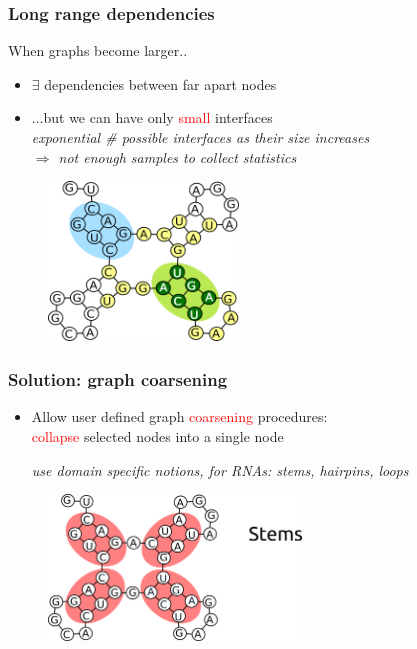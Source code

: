 \documentclass{beamer}
\newcommand{\red}[1]{\textcolor{red}{#1}}
\begin{document}
\begin{frame}
    \frametitle{Long range dependencies}
    When graphs become larger..
    \begin{itemize}
        \item $\exists$ dependencies between far apart nodes 
        \item ...but we can have only \red{small} interfaces  \\
        {\em exponential \# possible interfaces as their size increases} \\
        {\em $\Rightarrow$ not enough samples to collect statistics}
    \end{itemize}
   \begin{figure}[h!]
        \centering
        \includegraphics[width=0.45\textwidth]{images/longrangedep2.png}
    \end{figure}
    
\end{frame}


\begin{frame}
    \frametitle{Solution: graph coarsening}
    \begin{itemize}
        \item Allow user defined graph \red{coarsening} procedures:\\
        \red{collapse} selected nodes into a single node \\
        \begin{small}{\em use domain specific notions, for RNAs: stems, hairpins, loops}\end{small}
   \end{itemize}
   \begin{figure}[ht]
        \centering
        \includegraphics[width=0.6\textwidth]{images/stems.png}
    \end{figure}
\end{frame}
\end{document}
